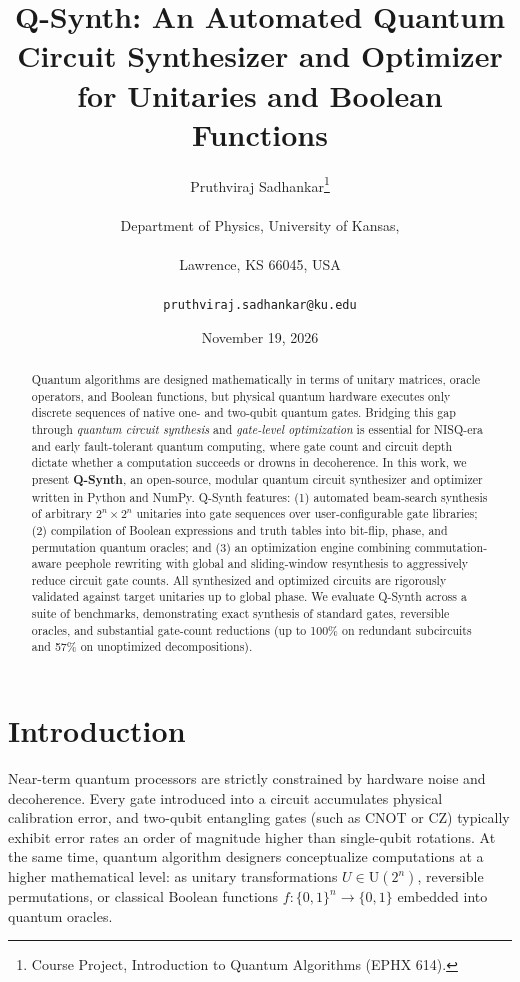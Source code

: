 \documentclass[11pt]{article}
\title{\textbf{Q-Synth: An Automated Quantum Circuit Synthesizer and Optimizer for Unitaries and Boolean Functions}}
\author{Pruthviraj Sadhankar\thanks{Course Project, Introduction to Quantum Algorithms (EPHX 614).}\\\\
Department of Physics, University of Kansas,\\\\
Lawrence, KS 66045, USA\\\\
\texttt{pruthviraj.sadhankar@ku.edu}}
\date{November 19, 2026}
\begin{document}
\maketitle

\begin{abstract}
Quantum algorithms are designed mathematically in terms of unitary matrices, oracle operators, and Boolean functions, but physical quantum hardware executes only discrete sequences of native one- and two-qubit quantum gates. Bridging this gap through \emph{quantum circuit synthesis} and \emph{gate-level optimization} is essential for NISQ-era and early fault-tolerant quantum computing, where gate count and circuit depth dictate whether a computation succeeds or drowns in decoherence. In this work, we present \textbf{Q-Synth}, an open-source, modular quantum circuit synthesizer and optimizer written in Python and NumPy. Q-Synth features: (1) automated beam-search synthesis of arbitrary $2^n \times 2^n$ unitaries into gate sequences over user-configurable gate libraries; (2) compilation of Boolean expressions and truth tables into bit-flip, phase, and permutation quantum oracles; and (3) an optimization engine combining commutation-aware peephole rewriting with global and sliding-window resynthesis to aggressively reduce circuit gate counts. All synthesized and optimized circuits are rigorously validated against target unitaries up to global phase. We evaluate Q-Synth across a suite of benchmarks, demonstrating exact synthesis of standard gates, reversible oracles, and substantial gate-count reductions (up to 100\% on redundant subcircuits and 57\% on unoptimized decompositions).
\end{abstract}

\tableofcontents
\newpage

\section{Introduction}
Near-term quantum processors are strictly constrained by hardware noise and decoherence. Every gate introduced into a circuit accumulates physical calibration error, and two-qubit entangling gates (such as CNOT or CZ) typically exhibit error rates an order of magnitude higher than single-qubit rotations. At the same time, quantum algorithm designers conceptualize computations at a higher mathematical level: as unitary transformations $U \in \mathrm{U}(2^n)$, reversible permutations, or classical Boolean functions $f: \{0,1\}^n \to \{0,1\}$ embedded into quantum oracles.
\end{document}
